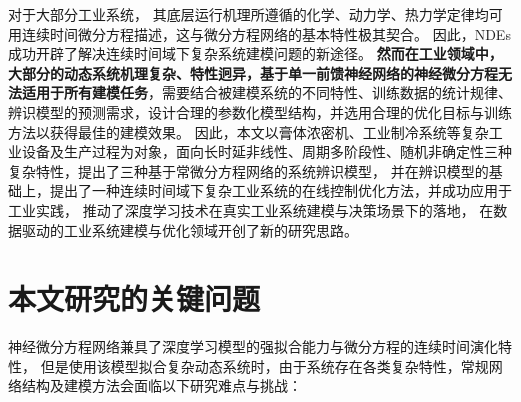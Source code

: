 

对于大部分工业系统，
其底层运行机理所遵循的化学、动力学、热力学定律均可用连续时间微分方程描述，这与微分方程网络的基本特性极其契合。
因此，NDEs成功开辟了解决连续时间域下复杂系统建模问题的新途径。
\textbf{然而在工业领域中，大部分的动态系统机理复杂、特性迥异，基于单一前馈神经网络的神经微分方程无法适用于所有建模任务}，需要结合被建模系统的不同特性、训练数据的统计规律、辨识模型的预测需求，设计合理的参数化模型结构，并选用合理的优化目标与训练方法以获得最佳的建模效果。
因此，本文以膏体浓密机、工业制冷系统等复杂工业设备及生产过程为对象，面向长时延非线性、周期多阶段性、随机非确定性三种复杂特性，提出了三种基于常微分方程网络的系统辨识模型，
并在辨识模型的基础上，提出了一种连续时间域下复杂工业系统的在线控制优化方法，并成功应用于工业实践，
推动了深度学习技术在真实工业系统建模与决策场景下的落地，
在数据驱动的工业系统建模与优化领域开创了新的研究思路。
\section{本文研究的关键问题}
\label{sec:challenge}

神经微分方程网络兼具了深度学习模型的强拟合能力与微分方程的连续时间演化特性，
但是使用该模型拟合复杂动态系统时，由于系统存在各类复杂特性，常规网络结构及建模方法会面临以下研究难点与挑战：
